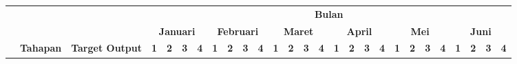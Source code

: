 \documentclass[oneside,listof=totoc]{scrbook}
\begin{document}
\clearpage
\begin{table}
\vspace{-8.5cm}
\hspace{-1.5cm}\noindent\begin{minipage}{\textwidth}
  \normalfont
  \setlength\extrarowheight{2pt}
  \vspace{0.3cm}
  \begin{longtable}{|l|p{3.0cm}|p{4.5cm}|l|l|l|l|l|l|l|l|l|l|l|l|l|l|l|l|l|l|l|l|l|l|l|l|}
  \hline
  \rowcolor[HTML]{DEEAF6}
  \multicolumn{1}{|c|}{\cellcolor[HTML]{DEEAF6}} & \multicolumn{1}{c|}{\cellcolor[HTML]{DEEAF6}} & \multicolumn{1}{c|}{\cellcolor[HTML]{DEEAF6}} & \multicolumn{24}{c|}{\cellcolor[HTML]{DEEAF6}\textbf{Bulan}} \\ \cline{4-27}
  \rowcolor[HTML]{DEEAF6}
  \multicolumn{1}{|c|}{\cellcolor[HTML]{DEEAF6}} & \multicolumn{1}{c|}{\cellcolor[HTML]{DEEAF6}} & \multicolumn{1}{c|}{\cellcolor[HTML]{DEEAF6}} & \multicolumn{4}{c|}{\cellcolor[HTML]{DEEAF6}\textbf{Januari}} & \multicolumn{4}{c|}{\cellcolor[HTML]{DEEAF6}\textbf{Februari}} & \multicolumn{4}{c|}{\cellcolor[HTML]{DEEAF6}\textbf{Maret}} & \multicolumn{4}{c|}{\cellcolor[HTML]{DEEAF6}\textbf{April}} & \multicolumn{4}{c|}{\cellcolor[HTML]{DEEAF6}\textbf{Mei}} & \multicolumn{4}{c|}{\cellcolor[HTML]{DEEAF6}\textbf{Juni}} \\ \cline{4-27}
  \rowcolor[HTML]{DEEAF6}
  \multicolumn{1}{|c|}{\multirow{-3}{*}{\cellcolor[HTML]{DEEAF6}\textbf{No}}} & \multicolumn{1}{c|}{\multirow{-3}{*}{\cellcolor[HTML]{DEEAF6}\textbf{Tahapan}}} & \multicolumn{1}{c|}{\multirow{-3}{*}{\cellcolor[HTML]{DEEAF6}\textbf{Target Output}}} & \multicolumn{1}{c|}{\cellcolor[HTML]{DEEAF6}\textbf{1}} & \multicolumn{1}{c|}{\cellcolor[HTML]{DEEAF6}\textbf{2}} & \multicolumn{1}{c|}{\cellcolor[HTML]{DEEAF6}\textbf{3}} & \multicolumn{1}{c|}{\cellcolor[HTML]{DEEAF6}\textbf{4}} & \multicolumn{1}{c|}{\cellcolor[HTML]{DEEAF6}\textbf{1}} & \multicolumn{1}{c|}{\cellcolor[HTML]{DEEAF6}\textbf{2}} & \multicolumn{1}{c|}{\cellcolor[HTML]{DEEAF6}\textbf{3}} & \multicolumn{1}{c|}{\cellcolor[HTML]{DEEAF6}\textbf{4}} & \multicolumn{1}{c|}{\cellcolor[HTML]{DEEAF6}\textbf{1}} & \multicolumn{1}{c|}{\cellcolor[HTML]{DEEAF6}\textbf{2}} & \multicolumn{1}{c|}{\cellcolor[HTML]{DEEAF6}\textbf{3}} & \multicolumn{1}{c|}{\cellcolor[HTML]{DEEAF6}\textbf{4}} & \multicolumn{1}{c|}{\cellcolor[HTML]{DEEAF6}\textbf{1}} & \multicolumn{1}{c|}{\cellcolor[HTML]{DEEAF6}\textbf{2}} & \multicolumn{1}{c|}{\cellcolor[HTML]{DEEAF6}\textbf{3}} & \multicolumn{1}{c|}{\cellcolor[HTML]{DEEAF6}\textbf{4}} & \multicolumn{1}{c|}{\cellcolor[HTML]{DEEAF6}\textbf{1}} & \multicolumn{1}{c|}{\cellcolor[HTML]{DEEAF6}\textbf{2}} & \multicolumn{1}{c|}{\cellcolor[HTML]{DEEAF6}\textbf{3}} & \multicolumn{1}{c|}{\cellcolor[HTML]{DEEAF6}\textbf{4}} & \multicolumn{1}{c|}{\cellcolor[HTML]{DEEAF6}\textbf{1}} & \multicolumn{1}{c|}{\cellcolor[HTML]{DEEAF6}\textbf{2}} & \multicolumn{1}{c|}{\cellcolor[HTML]{DEEAF6}\textbf{3}} & \multicolumn{1}{c|}{\cellcolor[HTML]{DEEAF6}\textbf{4}} \\ \hline

\end{longtable}
\end{minipage}
\end{table}
\end{document}
